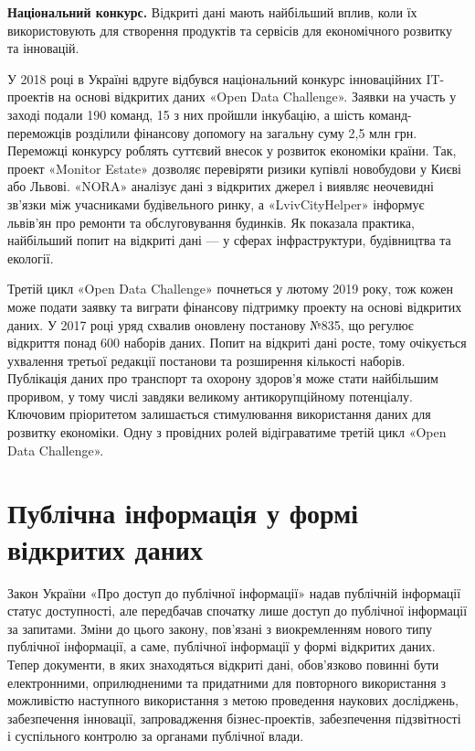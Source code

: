 \textbf{Національний конкурс.}
Відкриті дані мають найбільший вплив, коли їх використовують для створення продуктів та сервісів для економічного розвитку та інновацій.

У 2018 році в Україні вдруге відбувся національний конкурс інноваційних IT-проектів на основі відкритих даних «Open Data Challenge».
Заявки на участь у заході подали 190 команд, 15 з них пройшли інкубацію, а шість команд-переможців розділили фінансову допомогу на загальну суму 2,5 млн грн.
Переможці конкурсу роблять суттєвий внесок у розвиток економіки країни.
Так, проект «Monitor Estate» дозволяє перевіряти ризики купівлі новобудови у Києві або Львові.
«NORA» аналізує дані з відкритих джерел і виявляє неочевидні зв'язки між учасниками будівельного ринку, 
а «LvivCityHelper» інформує львів'ян про ремонти та обслуговування будинків.
Як показала практика, найбільший попит на відкриті дані — у сферах інфраструктури, будівництва та екології.

Третій цикл «Open Data Challenge»  почнеться у лютому 2019 року,
тож кожен може подати заявку та виграти фінансову підтримку проекту на основі відкритих даних.
У 2017 році уряд схвалив оновлену постанову №835, що регулює відкриття понад 600 наборів даних.
Попит на відкриті дані росте, тому очікується ухвалення третьої редакції постанови та розширення кількості наборів.
Публікація даних про транспорт та охорону здоров'я може стати найбільшим проривом,
у тому числі завдяки великому антикорупційному потенціалу.
Ключовим пріоритетом залишається стимулювання використання даних для розвитку економіки.
Одну з провідних ролей відіграватиме третій цикл «Open Data Challenge».

\section{Публічна інформація у формі відкритих даних}

Закон України «Про доступ до публічної інформації» надав
публічній інформації статус доступності, але передбачав спочатку
лише доступ до публічної інформації за запитами. Зміни до цього
закону, пов'язані з виокремленням нового типу публічної інформації,
а саме, публічної інформації у формі відкритих даних.
Тепер документи, в яких знаходяться відкриті дані, обов'язково
повинні бути електронними, оприлюдненими та
придатними для повторного використання з можливістю наступного
використання з метою проведення наукових досліджень, забезпечення
інновації, запровадження бізнес-проектів, забезпечення підзвітності і
суспільного контролю за органами публічної влади.

